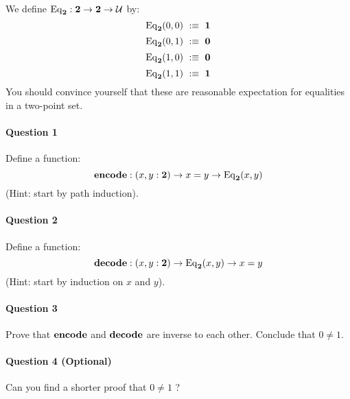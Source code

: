 \documentclass{article}[6pt]%
\newcommand{\U}{{\mathcal U}}
\renewcommand{\r}{\rightarrow}
\newcommand{\one}{{\bf 1}}
\newcommand{\zero}{{\bf 0}}
\newcommand{\two}{{\bf 2}}
\newcommand{\Eq}{\mathrm{Eq}}
\newcommand{\encode}{\mathrm{\bf encode}}
\newcommand{\decode}{\mathrm{\bf decode}}
\begin{document}
\begin{Exercise}[title={The type of booleans}]

We define $\Eq_\two : \two \r \two \r \U$ by:
\[\Eq_\two(0,0) \ :\equiv \ \one\]
\[\Eq_\two(0,1) \ :\equiv \ \zero\]
\[\Eq_\two(1,0) \ :\equiv \ \zero\]
\[\Eq_\two(1,1) \ :\equiv \ \one\]
You should convince yourself that these are reasonable expectation for equalities in a two-point set.

\paragraph{Question 1} Define a function:
\[\encode : (x,y:\two) \r x=y \r \Eq_\two(x,y)\]
(Hint: start by path induction).

\paragraph{Question 2} Define a function:
\[\decode : (x,y:\two) \r \Eq_\two(x,y)\r x=y\]
(Hint: start by induction on $x$ and $y$).

\paragraph{Question 3} Prove that $\encode$ and $\decode$ are inverse to each other. Conclude that $0\neq 1$.


\paragraph{Question 4 (Optional)} Can you find a shorter proof that $0\neq 1$ ? 

\end{Exercise}
\end{document}
